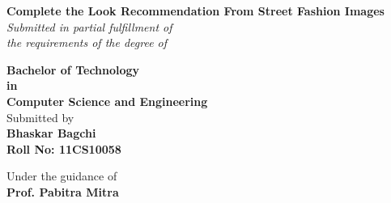 \begin{titlepage}

\begin{center}


\Large \textbf {Complete the Look Recommendation From Street Fashion Images}\\[0.5in]

       \small \emph{Submitted in partial fulfillment of\\
        the requirements of the degree of}
        \vspace{.2in}

       {\bf Bachelor of Technology \\in\\ Computer Science and Engineering}\\[0.5in]

\normalsize Submitted by \\
\vspace{0pt plus 0.2fil}
{\bf Bhaskar Bagchi}\\
\vspace{0pt plus 0.05fil}
{\bf Roll No: 11CS10058} \\
\centering


\vspace{.1in}
Under the guidance of\\
{\textbf{Prof. Pabitra Mitra}}\\[0.2in]

\vfill


\end{center}
\end{titlepage}
